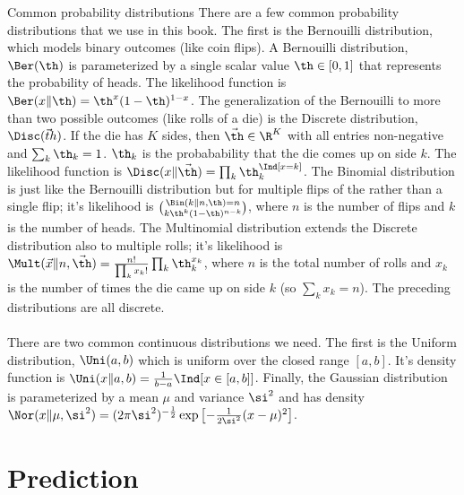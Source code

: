 \begin{mathreview}{Common probability distributions}
  There are a few common probability distributions that we use in this book.
  The first is the Bernouilli distribution, which models binary outcomes (like coin flips).
  A Bernouilli distribution, $\Ber(\th)$ is parameterized by a single scalar value $\th \in [0,1]$ that represents the probability of heads. The likelihood function is $\Ber(x \| \th) = \th^x (1-\th)^{1-x}$.
  The generalization of the Bernouilli to more than two possible outcomes (like rolls of a die) is the Discrete distribution, $\Disc(\vec th)$. If the die has $K$ sides, then $\vec \th \in \R^K$ with all entries non-negative and $\sum_k \th_k = 1$. $\th_k$ is the probabability that the die comes up on side $k$. The likelihood function is $\Disc(x \| \vec\th) = \prod_k \th_k^{\Ind[x=k]}$.
  The Binomial distribution is just like the Bernouilli distribution but for multiple flips of the rather than a single flip; it's likelihood is $\Bin(k \| n, \th) = n \choose k \th^k (1-\th)^{n-k}$, where $n$ is the number of flips and $k$ is the number of heads.
  The Multinomial distribution extends the Discrete distribution also to multiple rolls; it's likelihood is $\Mult(\vec x \| n, \vec\th) = \frac {n!} {\prod_k x_k!} \prod_k \th_k^{x_k}$, where $n$ is the total number of rolls and $x_k$ is the number of times the die came up on side $k$ (so $\sum_k x_k = n$).
  The preceding distributions are all discrete.
  ~\\~\\
  There are two common continuous distributions we need. The first is the Uniform distribution, $\Uni(a,b)$ which is uniform over the closed range $[a,b]$. It's density function is $\Uni(x \| a,b) = \frac 1 {b-a} \Ind[x \in [a,b]]$.
  Finally, the Gaussian distribution is parameterized by a mean $\mu$ and variance $\si^2$ and has density $\Nor(x \| \mu,\si^2) = (2 \pi \si^2)^{-\frac 1 2} \exp\left[ - \frac 1 {2 \si^2} (x-\mu)^2\right]$.
\end{mathreview}


\section{Prediction}

